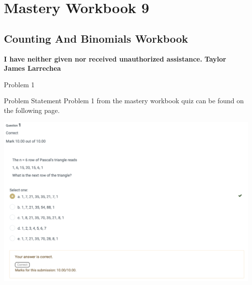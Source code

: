 \clearpage
\chapter{Mastery Workbook 9}

\section{Counting And Binomials Workbook}


\begin{center}
    \Large{\textbf{I have neither given nor received unauthorized assistance.}}
    \large{\textbf{Taylor James Larrechea}}
\end{center}

\begin{problem}{Problem 1}
    \begin{statement}{Problem Statement}
        Problem 1 from the mastery workbook quiz can be found on the following page.
    \end{statement}
    \begin{highlight}[Solution]
        \begin{center}
            \includegraphics[width = 1.0\textwidth]{Images/Problem 1.png}
        \end{center}
    \end{highlight}
\end{problem}

